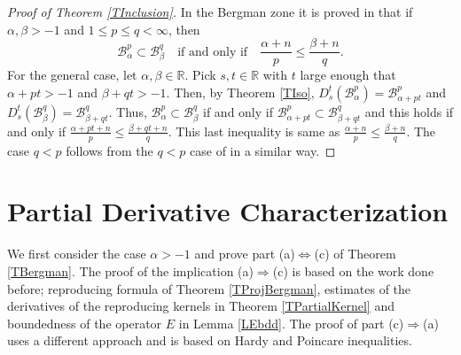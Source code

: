 \documentclass{amsart}
\theoremstyle{definition}
\theoremstyle{remark}
\begin{document}
\begin{proof}[Proof of Theorem \ref{TInclusion}]
In the Bergman zone it is proved in \cite[Theorem 1.3]{U2} that
if $\alpha,\beta>-1$ and $1\le p\le q<\infty$, then
\begin{equation*}
\mathcal B^p_\alpha\subset\mathcal B^q_\beta\quad
  \text{if and only if}\quad
  \frac{\alpha+n}{p}\leq\frac{\beta+n}{q}.
\end{equation*}
For the general case, let $\alpha,\beta\in\mathbb R$.
Pick $s,t\in\mathbb R$ with $t$ large enough that $\alpha+pt>-1$
and $\beta+qt>-1$.
Then, by Theorem \ref{TIso},
$D^t_s(\mathcal B^p_\alpha)=\mathcal B^p_{\alpha+pt}$
and
$D^t_s(\mathcal B^q_\beta)=\mathcal B^q_{\beta+qt}$.
Thus,  $\mathcal B^p_\alpha\subset\mathcal B^q_\beta$
if and only if
$\mathcal B^p_{\alpha+pt}\subset\mathcal B^q_{\beta+qt}$
and this holds if and only if
$\frac{\alpha+pt+n}{p}\le\frac{\beta+qt+n}{q}$.
This last inequality is same as
$\frac{\alpha+n}{p}\le\frac{\beta+n}{q}$.
The case $q<p$ follows from the $q<p$ case of \cite[Theorem 1.3]{U2}
in a similar way.
\end{proof}

%
\section{Partial Derivative Characterization}
%

We first consider the case $\alpha>-1$ and prove part (a)$\Leftrightarrow$(c)
of Theorem \ref{TBergman}.
The proof of the implication (a)$\Rightarrow$(c) is based on the work
done before; reproducing formula of Theorem \ref{TProjBergman}, estimates
of the derivatives of the reproducing kernels in Theorem \ref{TPartialKernel}
and boundedness of the operator $E$ in Lemma \ref{LEbdd}.
The proof of part (c)$\Rightarrow$(a) uses a different approach and is based on
Hardy and Poincare inequalities.
\end{document}
